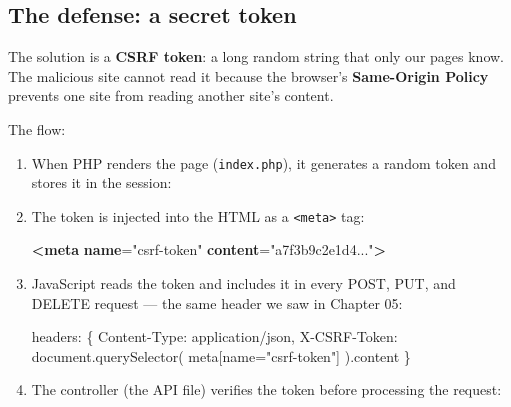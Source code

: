 \documentclass[11pt,a4paper,oneside]{book}
\newenvironment{Shaded}{\begin{snugshade}}{\end{snugshade}}
\newcommand{\KeywordTok}[1]{\textcolor[HTML]{007020}{\textbf{#1}}}
\newcommand{\DecValTok}[1]{\textcolor[HTML]{40A070}{#1}}
\newcommand{\StringTok}[1]{\textcolor[HTML]{4070A0}{#1}}
\newcommand{\OtherTok}[1]{\textcolor[HTML]{007020}{#1}}
\newcommand{\FunctionTok}[1]{\textcolor[HTML]{06287E}{#1}}
\newcommand{\VariableTok}[1]{\textcolor[HTML]{19177C}{#1}}
\newcommand{\OperatorTok}[1]{\textcolor[HTML]{666666}{#1}}
\newcommand{\BuiltInTok}[1]{#1}
\newcommand{\AttributeTok}[1]{\textcolor[HTML]{7D9029}{#1}}
\newcommand{\ErrorTok}[1]{\textcolor[HTML]{FF0000}{\textbf{#1}}}
\newcommand{\NormalTok}[1]{#1}
\begin{document}
\hypertarget{the-defense-a-secret-token}{%
\subsection{The defense: a secret
token}\label{the-defense-a-secret-token}}

The solution is a \textbf{CSRF token}: a long random string that
only our pages know. The malicious site cannot read it because
the browser's \textbf{Same-Origin Policy} prevents one site from
reading another site's content.

The flow:

\begin{enumerate}
\def\labelenumi{\arabic{enumi}.}
\item
  When PHP renders the page (\texttt{index.php}), it generates a
  random token and stores it in the session:

\begin{Shaded}
\end{Shaded}
\item
  The token is injected into the HTML as a
  \texttt{\textless{}meta\textgreater{}} tag:

\begin{Shaded}
\begin{Highlighting}[]
\KeywordTok{\textless{}meta} \ErrorTok{name}\OtherTok{=}\StringTok{"csrf{-}token"} \ErrorTok{content}\OtherTok{=}\StringTok{"a7f3b9c2e1d4..."}\KeywordTok{\textgreater{}}
\end{Highlighting}
\end{Shaded}
\item
  JavaScript reads the token and includes it in every POST, PUT,
  and DELETE request --- the same header we saw in Chapter 05:

\begin{Shaded}
\begin{Highlighting}[]
\NormalTok{headers}\OperatorTok{:}\NormalTok{ \{}
    \StringTok{\textquotesingle{}Content{-}Type\textquotesingle{}}\OperatorTok{:} \StringTok{\textquotesingle{}application/json\textquotesingle{}}\OperatorTok{,}
    \StringTok{\textquotesingle{}X{-}CSRF{-}Token\textquotesingle{}}\OperatorTok{:} \BuiltInTok{document}\OperatorTok{.}\FunctionTok{querySelector}\NormalTok{(}
        \StringTok{\textquotesingle{}meta[name="csrf{-}token"]\textquotesingle{}}
\NormalTok{    )}\OperatorTok{.}\AttributeTok{content}
\NormalTok{\}}
\end{Highlighting}
\end{Shaded}
\item
  The controller (the API file) verifies the token before
  processing the request:


\end{enumerate}
\end{document}
